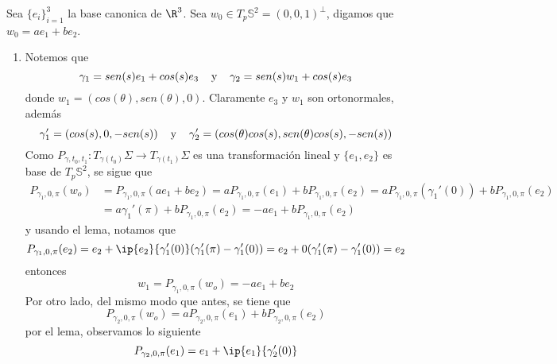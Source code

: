 \documentclass{article}
\begin{document}
\noindent Sea $\{e_{i}\}_{i=1}^{3}$ la base canonica de $\R^{3}$. Sea $w_{0}\in 
T_{p}\mathbb{S}^{2}=(0,0,1)^{\perp}$, digamos que $w_{0}=ae_{1}+be_{2}$.
\begin{enumerate}
    \item Notemos que
    \begin{equation*}
        \gamma_{1}=sen(s)e_{1}+cos(s)e_{3}\hspace{4mm}\text{y}\hspace{4mm}
        \gamma_{2}=sen(s)w_{1}+cos(s)e_{3}
    \end{equation*}
    donde $w_{1}=(cos(\theta),sen(\theta),0)$. Claramente $e_{3}$ y $w_{1}$ son ortonormales, 
    además
    \begin{equation*}
        \gamma_{1}'=(cos(s),0,-sen(s))\hspace{4mm}\text{y}\hspace{4mm}
        \gamma_{2}'=(cos(\theta)cos(s),sen(\theta)cos(s),-sen(s))
    \end{equation*}
    Como $P_{\gamma,t_{0},t_{1}}:T_{\gamma(t_{0})}\Sigma\to T_{\gamma(t_{1})}\Sigma$ es una 
    transformación lineal y $\{e_{1},e_{2}\}$ es base de $T_{p}\mathbb{S}^{2}$, se sigue que
    \begin{align*}
        P_{\gamma_{1},0,\pi}(w_{o}) &= P_{\gamma_{1},0,\pi}(ae_{1}+be_{2})
        =aP_{\gamma_{1},0,\pi}(e_{1})+bP_{\gamma_{1},0,\pi}(e_{2})
        =aP_{\gamma_{1},0,\pi}(\gamma_{1}'(0))+bP_{\gamma_{1},0,\pi}(e_{2}) \\[2mm]
        &= a\gamma_{1}'(\pi)+bP_{\gamma_{1},0,\pi}(e_{2})=-ae_{1}+bP_{\gamma_{1},0,\pi}(e_{2})
    \end{align*}
    y usando el lema, notamos que
    \begin{equation*}
        P_{\gamma_{1},0,\pi}(e_{2})=e_{2}+\ip{e_{2}}{\gamma_{1}'(0)}
        (\gamma_{1}'(\pi)-\gamma_{1}'(0))=e_{2}+0(\gamma_{1}'(\pi)-\gamma_{1}'(0))=e_{2}
    \end{equation*}
    entonces
    \begin{equation*}
        w_{1}=P_{\gamma_{1},0,\pi}(w_{o})=-ae_{1}+be_{2}
    \end{equation*}
    Por otro lado, del mismo modo que antes, se tiene que
    \begin{equation*}
        P_{\gamma_{2},0,\pi}(w_{o})=aP_{\gamma_{2},0,\pi}(e_{1})
        +bP_{\gamma_{2},0,\pi}(e_{2})
    \end{equation*}
    por el lema, observamos lo siguiente
    \begin{equation*}
        P_{\gamma_{2},0,\pi}(e_{1})=e_{1}+\ip{e_{1}}{\gamma_{2}'(0)}

\end{equation*}
\end{enumerate}
\end{document}
